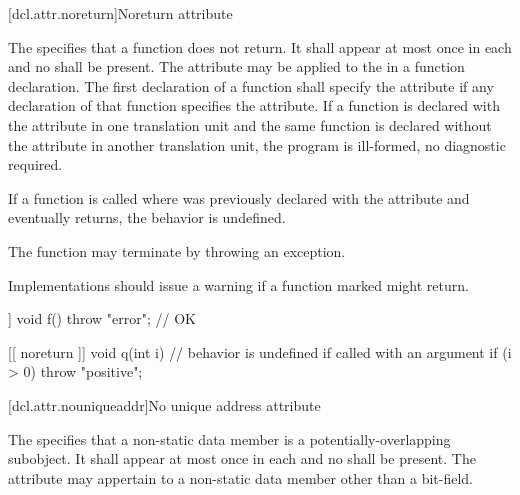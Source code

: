 [dcl.attr.noreturn]{Noreturn attribute}%

\pnum
The   specifies that a function does not return. It
shall appear at most once in each  and no
 shall be present. The attribute may be applied to the
 in a function declaration. The first declaration of a function shall
specify the  attribute if any declaration of that function specifies the
 attribute. If a function is declared with the  attribute in one
translation unit and the same function is declared without the  attribute in another
translation unit, the program is ill-formed, no diagnostic required.

\pnum
If a function  is called where  was previously declared with the 
attribute and  eventually returns, the behavior is undefined.
\begin{note}
The function may
terminate by throwing an exception.
\end{note}

\pnum
\recommended
Implementations should issue a
warning if a function marked \tcode{[[noreturn]]} might return.

\pnum
\begin{example}
\begin{codeblock}
[[ noreturn ]] void f() {
  throw "error";                // OK
}

[[ noreturn ]] void q(int i) {  // behavior is undefined if called with an argument 
  if (i > 0)
    throw "positive";
}
\end{codeblock}
\end{example}

[dcl.attr.nouniqueaddr]{No unique address attribute}%

\pnum
The  
specifies that a non-static data member
is a potentially-overlapping subobject.
It shall appear at most once in each 
and no  shall be present.
The attribute may appertain to a non-static data member
other than a bit-field.

